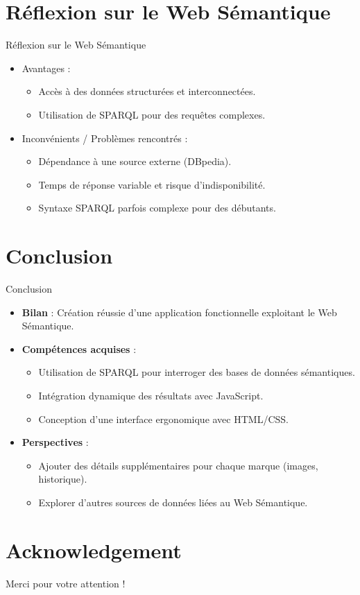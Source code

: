 \documentclass[10pt]{beamer}
\begin{document}
\section{Réflexion sur le Web Sémantique}
\begin{frame}{Réflexion sur le Web Sémantique}
\begin{itemize}
    \item Avantages :  
        \begin{itemize}
            \item Accès à des données structurées et interconnectées.  
            \item Utilisation de SPARQL pour des requêtes complexes.  
        \end{itemize}
    \item Inconvénients / Problèmes rencontrés :  
        \begin{itemize}
            \item Dépendance à une source externe (DBpedia).  
            \item Temps de réponse variable et risque d'indisponibilité.  
            \item Syntaxe SPARQL parfois complexe pour des débutants.  
        \end{itemize}
\end{itemize}
\end{frame}

\section{Conclusion}
\begin{frame}{Conclusion}
\begin{itemize}
    \item \textbf{Bilan} : Création réussie d'une application fonctionnelle exploitant le Web Sémantique.  
    \item \textbf{Compétences acquises} :  
        \begin{itemize}
            \item Utilisation de SPARQL pour interroger des bases de données sémantiques.  
            \item Intégration dynamique des résultats avec JavaScript.  
            \item Conception d'une interface ergonomique avec HTML/CSS.  
        \end{itemize}
    \item \textbf{Perspectives} :  
        \begin{itemize}
            \item Ajouter des détails supplémentaires pour chaque marque (images, historique).  
            \item Explorer d'autres sources de données liées au Web Sémantique.  
        \end{itemize}
\end{itemize}
\end{frame}

\section*{Acknowledgement}
\begin{frame}
\textcolor{myNewColorA}{\Huge{\centerline{Merci pour votre attention !}}}
\end{frame}
\end{document}
